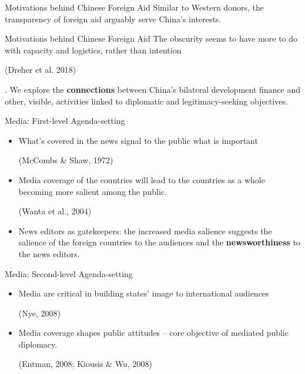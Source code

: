 \documentclass[
  ignorenonframetext,
]{beamer}
\begin{document}
\begin{frame}
\begin{frame}{Motivations behind Chinese Foreign Aid}
Similar to Western donors, the transparency of foreign aid arguably serve China’s interests.
\end{frame}

\begin{frame}{Motivations behind Chinese Foreign Aid}
The obscurity seems to have more to do with capacity and logistics, rather than intention \begin{footnotesize} (Dreher et al. 2018) \end{footnotesize}. We
explore the \textbf{connections }between China’s bilateral development finance and other, visible,
activities linked to diplomatic and legitimacy-seeking objectives. 

\end{frame}

\begin{frame}{Media: First-level Agenda-setting}


\begin{itemize}
\item What's covered in the news signal to the public what is important \begin{footnotesize} (McCombs \& Shaw, 1972) \end{footnotesize}

\item Media coverage of the countries will lead to the countries as a whole becoming more
salient among the public. \begin{footnotesize} (Wanta et al., 2004) \end{footnotesize}

\item News editors as gatekeepers: the increased media salience suggests the salience of the foreign countries to the audiences and the \textbf{newsworthiness }to the news editors.
\end{itemize}

\end{frame}

\begin{frame}{Media: Second-level Agenda-setting}


\begin{itemize}
\item Media are critical in building states’ image to international audiences \begin{footnotesize} (Nye, 2008) \end{footnotesize}

\item Media coverage shapes public attitudes -- core objective of mediated public diplomacy. \begin{footnotesize} (Entman, 2008; Kiousis \& Wu, 2008) \end{footnotesize}


\end{itemize}
\end{frame}
\end{frame}
\end{document}
